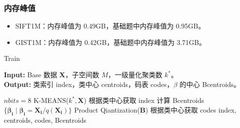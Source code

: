 \documentclass{article}
\begin{document}
\subsubsection*{内存峰值}
\begin{itemize}
		\item SIFT1M：内存峰值为 0.49GB，基础题中内存峰值为 0.95GB。
		\item GIST1M：内存峰值为 0.42GB，基础题中内存峰值为 3.71GB。
\end{itemize}

\begin{algorithm}[h]
\small
\caption{Train} %
\hspace*{0.02in} {\bf Input:} %
	Base 数据 $\mathbf{X}$，子空间数 $M$，一级量化聚类数 $k^*$。 \\
\hspace*{0.02in} {\bf Output:} %
	类索引 index，类中心 centroids，码表 codes，$\beta$ 的中心 Bcentroids。
\begin{algorithmic}[1]
		\State $nbits = 8$
		\State K-MEANS($k^*, \mathbf{X}$)
		\State 根据类中心获取 index
		\State 计算 Bcentroids$\{\boldsymbol{\beta_i} \; | \; \boldsymbol{\beta_i} = \mathbf{X_i} / q(\mathbf{X_i})\}$
		\State Product Qiantization($\mathbf{B}$)
		\State 根据类中心获取 codes
\State \Return index, centroids, codes, Bcentroids
\end{algorithmic}
\end{algorithm}
\end{document}
